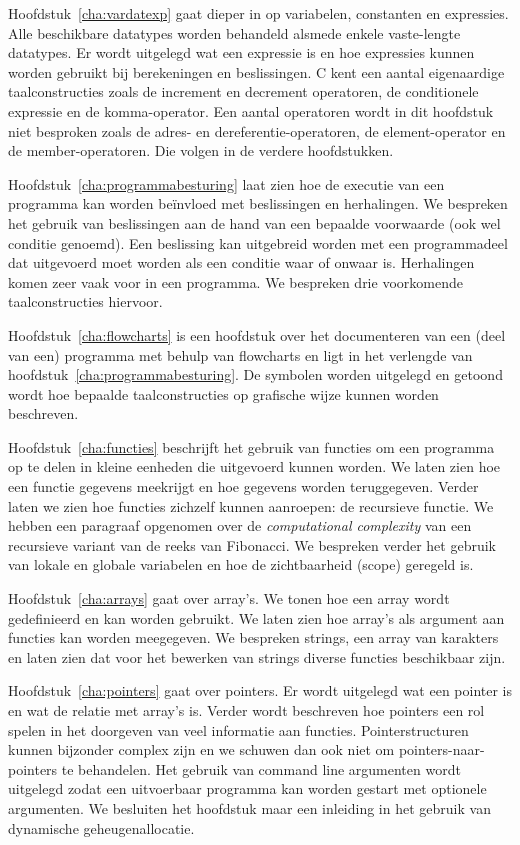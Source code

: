 Hoofdstuk~\ref{cha:vardatexp} gaat dieper in op variabelen, constanten en expressies. Alle beschikbare datatypes worden behandeld alsmede enkele vaste-lengte datatypes. Er wordt uitgelegd wat een expressie is en hoe expressies kunnen worden gebruikt bij berekeningen en beslissingen. C kent een aantal eigenaardige taalconstructies zoals de increment en decrement operatoren, de conditionele expressie en de komma-operator. Een aantal operatoren wordt in dit hoofdstuk niet besproken zoals de adres- en dereferentie-operatoren, de element-operator en de member-operatoren. Die volgen in de verdere hoofdstukken.

Hoofdstuk~\ref{cha:programmabesturing} laat zien hoe de executie van een programma kan worden beïnvloed met beslissingen en herhalingen. We bespreken het gebruik van beslissingen aan de hand van een bepaalde voorwaarde (ook wel conditie genoemd). Een beslissing kan uitgebreid worden met een programmadeel dat uitgevoerd moet worden als een conditie waar of onwaar is. Herhalingen komen zeer vaak voor in een programma. We bespreken drie voorkomende taalconstructies hiervoor.

Hoofdstuk~\ref{cha:flowcharts} is een hoofdstuk over het documenteren van een (deel van een) programma met behulp van flowcharts en ligt in het verlengde van hoofdstuk~\ref{cha:programmabesturing}. De symbolen worden uitgelegd en
getoond wordt hoe bepaalde taalconstructies op grafische wijze kunnen worden beschreven.

Hoofdstuk~\ref{cha:functies} beschrijft het gebruik van functies om een programma op te delen in kleine eenheden die uitgevoerd kunnen worden. We laten zien hoe een functie gegevens meekrijgt en hoe gegevens worden teruggegeven. Verder laten we zien hoe functies zichzelf kunnen aanroepen: de recursieve functie. We hebben een paragraaf opgenomen over de \textsl{computational complexity} van een recursieve variant van de reeks van Fibonacci. We bespreken verder het gebruik van lokale en globale variabelen en hoe de zichtbaarheid (scope) geregeld is.

Hoofdstuk~\ref{cha:arrays} gaat over array's. We tonen hoe een array wordt gedefinieerd en kan worden gebruikt. We laten zien hoe array's als argument aan functies kan worden meegegeven. We bespreken strings, een array van karakters en laten zien dat voor het bewerken van strings diverse functies beschikbaar zijn.

Hoofdstuk~\ref{cha:pointers} gaat over pointers. Er wordt uitgelegd wat een pointer is en wat de relatie met array's is. Verder wordt beschreven hoe pointers een rol spelen in het doorgeven van veel informatie aan functies. Pointerstructuren kunnen bijzonder complex zijn en we schuwen dan ook niet om pointers-naar-pointers te behandelen. Het gebruik van command line argumenten wordt uitgelegd zodat een uitvoerbaar programma kan worden gestart met optionele argumenten. We besluiten het hoofdstuk maar een inleiding in het gebruik van dynamische geheugenallocatie.

